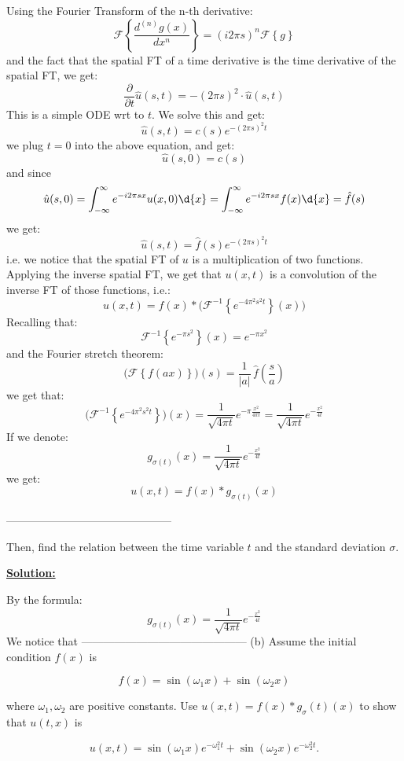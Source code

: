 \documentclass{article}
\begin{document}
Using the Fourier Transform of the n-th derivative:
\[
  \mathcal{F} \left\{ \frac{d^{(n)}g(x)}{d x^n}  \right\} = (i 2\pi s )^{n} \mathcal{F} \left\{ g \right\}
\]
and the fact that the spatial FT of a time derivative is the time derivative of the spatial FT, we get:
\[
  \frac{\partial }{\partial t} \hat{u}(s,t) = - (2 \pi s)^2  \cdot  \hat{u}(s,t)   
\]
This is a simple ODE wrt to $t$. We solve this  and get:
\[
  \hat{u}(s,t) = c(s) e^{- (2 \pi s)^2 t}  
\]
we plug $t=0$ into the above equation, and get:
\[
  \hat{u}(s,0) = c(s) 
\]
and since
\[
  \hat{u}(s,0) = \int_{-\infty}^{\infty} e^{-i 2 \pi s x} u(x,0) \d{x} = \int_{-\infty}^{\infty} e^{-i 2 \pi s x} f(x) \d{x} = \hat{f}(s)  
\]
we get:
\[
  \hat{u}(s,t) = \hat{f}(s) e^{-(2 \pi s) ^2 t}   
\]
i.e. we notice that the spatial FT of $u$ is a multiplication of two functions. Applying the inverse spatial FT, we get that $u(x,t)$ is a convolution of the inverse FT of those functions, i.e.:
\[
  u(x,t) = f(x) \ast \Big( \mathcal{F}^{-1} \left\{ e^{-4 \pi^2 s ^2 t}  \right\} (x) \Big)
\]
Recalling that:
\[
  \mathcal{F}^{-1} \left\{ e^{- \pi s ^2}  \right\}(x) = e^{- \pi x ^2} 
\]
and the Fourier stretch theorem:
\[
  \big(\mathcal{F} \left\{ f(ax) \right\}\big)(s) = \frac{1}{|a|} \, \hat{f}(\frac{s}{a}) 
\]
we get that:
\[
  \big( \mathcal{F} ^{-1}  \left\{ e^{ - 4 \pi ^2 s ^2 t} \right\} \big) (x) =  \frac{1}{\sqrt{ 4 \pi t }} e^{ - \pi \frac{x ^2}{4 \pi t}}  = \frac{1}{\sqrt{  4 \pi t }} e^{ - \frac{x ^2}{4t}} 
\]
If we denote:
\[
  g_{\sigma (t)}(x) = \frac{1}{\sqrt{ 4 \pi t }} e^{- \frac{x ^2}{4t}} 
\]
we get:
\[
  \boxed  {u(x,t) = f(x) \ast g_{\sigma(t)}(x)}
\]

--------------------------------------------- 

Then, find the relation between the time variable \(t\) and the standard deviation \(\sigma\).

\textbf{\ul{Solution:}}

By the formula:
\[
  g_{\sigma (t)}(x) = \frac{1}{\sqrt{ 4 \pi t }} e^{- \frac{x ^2}{4t}} 
\]
We notice that 
---------------------------------------------
(b) Assume the initial condition \(f(x)\) is

\begin{equation}
f(x) = \sin(\omega_1 x) + \sin(\omega_2 x)
\end{equation}

where \(\omega_1, \omega_2\) are positive constants. Use $u(x,t) = f(x) * g_\sigma(t)(x)
 $ to show that \(u(t, x)\) is 

\begin{equation}
u(x,t) = \sin(\omega_1 x)e^{-\omega_1^2 t} + \sin(\omega_2 x)e^{-\omega_2^2 t}.
\end{equation}
\end{document}
